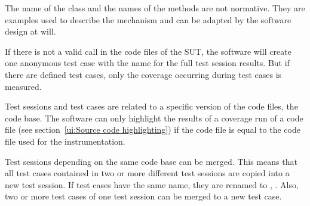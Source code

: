 \par
The name of the  class and the names of the methods are not normative. They are examples used to describe the mechanism and can be adapted by the software design at will.
\par
If there is not a valid  call in the code files of the SUT, the software will create one anonymous test case with the name  for the full test session results. But if there are defined test cases, only the coverage occurring during test cases is measured.
\par
Test sessions and test cases are related to a specific version of the code files, the code base. The software can only highlight the results of a coverage run of a code file (see section~\ref{ui:Source code highlighting}) if the code file is equal to the code file used for the instrumentation.
\par
Test sessions depending on the same code base can be merged. This means that all test cases contained in two or more different test sessions are copied into a new test session. If test cases have the same name, they are renamed to , . Also, two or more test cases of one test session can be merged to a new test case.

